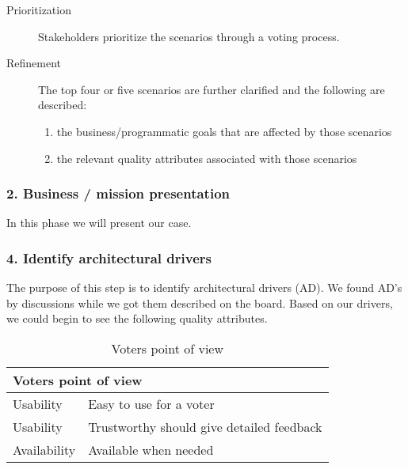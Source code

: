 \begin{description}
    \item [Prioritization] 
  Stakeholders prioritize the scenarios through a voting process. 
    
    \item [Refinement]
        The top four or five scenarios are further clarified and the following are described:
        \begin{enumerate}
            \item the business/programmatic goals that are affected by those scenarios
            \item the relevant quality attributes associated with those scenarios   
        \end{enumerate}

   

\end{description}




\subsubsection{2. Business / mission presentation}
In this phase we will present our case.
 

\subsubsection{4. Identify architectural drivers}
The purpose of this step is to identify architectural drivers (AD). We found AD's by discussions while we got them described on the board. Based on our drivers, we could begin to see the following quality attributes.\\


\begin{table}[H]
\centering
\begin{tabular}{|l|l|}
\hline
\multicolumn{2}{|l|}{Voters point of view}                \\ \hline
Usability    & Easy to use for a voter                   \\ \hline
Usability    & Trustworthy should give detailed feedback \\ \hline
Availability & Available when needed                     \\ \hline
\end{tabular}
\caption{Voters point of view}
\label{my-label}
\end{table}


